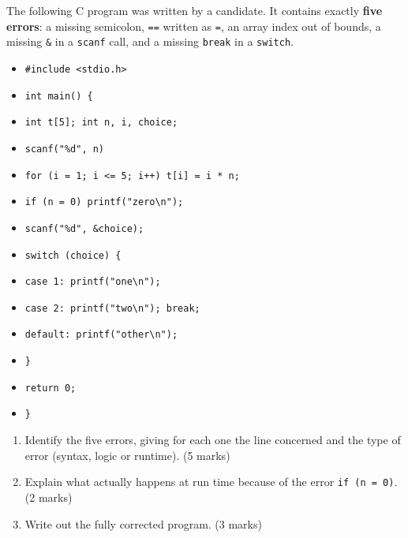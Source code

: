 \documentclass[11pt]{article}
\begin{document}
\begin{exercice}
The following C program was written by a candidate. It contains exactly \textbf{five errors}: a missing semicolon, \texttt{==} written as \texttt{=}, an array index out of bounds, a missing \texttt{\&} in a \texttt{scanf} call, and a missing \texttt{break} in a \texttt{switch}.
\begin{itemize}
\item \texttt{\#include <stdio.h>}
\item \texttt{int main() \{}
\item \texttt{\quad int t[5]; int n, i, choice;}
\item \texttt{\quad scanf("\%d", n)}
\item \texttt{\quad for (i = 1; i <= 5; i++) t[i] = i * n;}
\item \texttt{\quad if (n = 0) printf("zero\textbackslash n");}
\item \texttt{\quad scanf("\%d", \&choice);}
\item \texttt{\quad switch (choice) \{}
\item \texttt{\quad\quad case 1: printf("one\textbackslash n");}
\item \texttt{\quad\quad case 2: printf("two\textbackslash n"); break;}
\item \texttt{\quad\quad default: printf("other\textbackslash n");}
\item \texttt{\quad \}}
\item \texttt{\quad return 0;}
\item \texttt{\}}
\end{itemize}
\begin{enumerate}
\item Identify the five errors, giving for each one the line concerned and the type of error (syntax, logic or runtime). \hfill (5 marks)
\item Explain what actually happens at run time because of the error \texttt{if (n = 0)}. \hfill (2 marks)
\item Write out the fully corrected program. \hfill (3 marks)
\end{enumerate}
\end{exercice}
\end{document}
